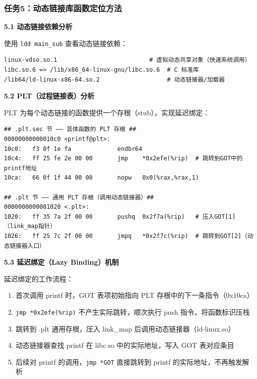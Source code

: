 \documentclass[12pt,a4paper]{ctexart}
\begin{document}
\subsubsection*{任务5：动态链接库函数定位方法}

\textbf{5.1 动态链接依赖分析}

使用 \texttt{ldd main\_sub} 查看动态链接依赖：

\begin{lstlisting}
linux-vdso.so.1                          # 虚拟动态共享对象（快速系统调用）
libc.so.6 => /lib/x86_64-linux-gnu/libc.so.6  # C 标准库
/lib64/ld-linux-x86-64.so.2                   # 动态链接器/加载器
\end{lstlisting}

\textbf{5.2 PLT（过程链接表）分析}

PLT 为每个动态链接的函数提供一个存根（stub），实现延迟绑定：

\begin{lstlisting}
## .plt.sec 节 —— 具体函数的 PLT 存根 ##
00000000000010c0 <printf@plt>:
10c0:   f3 0f 1e fa             endbr64
10c4:   ff 25 fe 2e 00 00       jmp    *0x2efe(%rip)  # 跳转到GOT中的printf地址
10ca:   66 0f 1f 44 00 00       nopw   0x0(%rax,%rax,1)

## .plt 节 —— 通用 PLT 存根（调用动态链接器）##
0000000000001020 <.plt>:
1020:   ff 35 7a 2f 00 00       pushq  0x2f7a(%rip)   # 压入GOT[1]（link_map指针）
1026:   ff 25 7c 2f 00 00       jmpq   *0x2f7c(%rip)  # 跳转到GOT[2]（动态链接器入口）
\end{lstlisting}

\textbf{5.3 延迟绑定（Lazy Binding）机制}

延迟绑定的工作流程：

\begin{enumerate}[label=\textcircled{\arabic*},nosep]
    \item 首次调用 printf 时，GOT 表项初始指向 PLT 存根中的下一条指令（0x10ca）
    \item \texttt{jmp *0x2efe(\%rip)} 不产生实际跳转，顺次执行 push 指令，将函数标识压栈
    \item 跳转到 .plt 通用存根，压入 link\_map 后调用动态链接器（ld-linux.so）
    \item 动态链接器查找 printf 在 libc.so 中的实际地址，写入 GOT 表对应条目
    \item 后续对 printf 的调用，\texttt{jmp *GOT} 直接跳转到 printf 的实际地址，不再触发解析
\end{enumerate}
\end{document}

